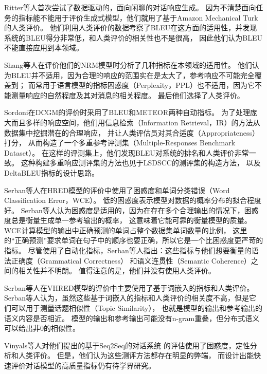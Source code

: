 Ritter等人首次尝试了数据驱动的，面向闲聊的对话响应生成。
因为不清楚面向任务的指标能不能用于评价生成式模型，他们就用了基于Amazon Mechanical Turk的人类评价。
他们利用人类评价的数据考察了BLEU在这方面的适用性，并发现系统的BLEU得分非常低，和人类评价的相关性也不是很高，
因此他们认为BLEU不能直接应用到本领域。


Shang等人在评价他们的NRM模型时分析了几种指标在本领域的适用性。
他们认为BLEU并不适用，因为合理的响应的范围实在是太大了，参考响应不可能完全覆盖到；
而常用于语言模型的指标困惑度（Perplexity，PPL）也不适用，因为它不能测量响应的自然程度及其对消息的相关程度。
最后他们选择了人类评价。

Sordoni在DCGM的评价时采用了BLEU和METEOR两种自动指标。
为了处理庞大而且多样的响应空间，他们用信息检索（Information Retrieval，IR）的方法从数据集中挖掘潜在的合理响应，
并让人类评估员对其合适度（Appropriateness）打分，
从而构造了一个多重参考评测集（Multiple-Responses Benchmark Dataset）。
在这样的评测集上，他们发现BLEU对系统的排名和人类评价非常一致。
这种构建多重响应测评集的方法也见于LSDSCC的测评集的构造方法，
以及DeltaBLEU指标的设计思路。

Serban等人在HRED模型的评价中使用了困惑度和单词分类错误（Word Classification Error，WCE）。
低的困惑度表示模型对数据的概率分布的拟合程度好。
Serban等人认为困惑度是适用的，因为在存在多个合理输出的情况下，困惑度总是衡量生成单一参考输出的概率，
这意味着它能可靠的衡量模型的质量。
WCE计算模型的输出中正确预测的单词占整个数据集单词数量的比例，
这里的“正确预测”要求单词在句子中的顺序也要正确，所以它是一个比困惑度更严苛的指标。
尽管使用了自动化指标，Serban等人指出：这些指标与他们想要衡量的语法正确度（Grammatical Correctness）
和语义连贯性（Semantic Coherence）之间的相关性并不明朗。
值得注意的是，他们并没有使用人类评价。

Serban等人在VHRED模型的评价中主要使用了基于词嵌入的指标和人类评价。
Serban等人认为，虽然这些基于词嵌入的指标和人类评价的相关度不高，但是它们可以用于测量话题相似性（Topic Similarity），
也就是模型的输出和参考输出的语义内容是否相近。
模型的输出和参考输出可能没有n-gram重叠，但分布式语义可以给出非0的相似性。

Vinyals等人对他们提出的基于Seq2Seq的对话系统
的评估使用了困惑度，定性分析和人类评价。
但是，他们认为这些测评方法都存在明显的弊端，
而设计出能快速评价对话模型的高质量指标仍有待学界研究。

